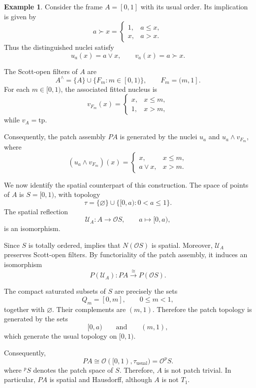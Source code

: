 \documentclass[11pt]{amsart}
\theoremstyle{plain}
\theoremstyle{definition}
\newtheorem{ej}[thm]{Example}
\begin{document}
\begin{ej}\label{ex:unit-interval-patch}
Consider the frame $A=[0,1]$ with its usual
order. Its implication is given by
\[
a\succ x=
\begin{cases}
1,&a\leq x,\\
x,&a>x.
\end{cases}
\]
Thus the distinguished nuclei satisfy
\[
u_a(x)=a\vee x,
\qquad
v_a(x)=a\succ x.
\]

The Scott-open filters of $A$ are
\[
A^\wedge
=\{A\}\cup\{F_m:m\in[0,1)\},
\qquad F_m=(m,1].
\]
For each $m\in[0,1)$, the associated fitted
nucleus is
\[
v_{F_m}(x)=
\begin{cases}
x,&x\leq m,\\
1,&x>m,
\end{cases}
\]
while $v_A=\mathrm{tp}$.

Consequently, the patch assembly $PA$ is
generated by the nuclei $u_a$ and
$u_a\wedge v_{F_m}$, where
\[
(u_a\wedge v_{F_m})(x)=
\begin{cases}
x,&x\leq m,\\
a\vee x,&x>m.
\end{cases}
\]

We now identify the spatial counterpart of
this construction. The space of points of
$A$ is $S=[0,1)$, with topology
\[
\tau=\{\varnothing\}\cup
\{[0,a):0<a\leq1\}.
\]
The spatial reflection
\[
\mathcal U_A:A\longrightarrow\mathcal OS,
\qquad a\longmapsto[0,a),
\]
is an isomorphism.

Since $S$ is totally ordered,
\cite[Corollary 4.2]{AvilaBezhaniMorandiZaldivar2020}
implies that $N(\mathcal OS)$ is spatial.
Moreover, $\mathcal U_A$ preserves
Scott-open filters. By functoriality of
the patch assembly, it induces an
isomorphism
\[
P(\mathcal U_A):PA
\xrightarrow{\cong}P(\mathcal OS).
\]

The compact saturated subsets of $S$ are
precisely the sets
\[
Q_m=[0,m],\qquad 0\leq m<1,
\]
together with $\varnothing$.
Their complements are $(m,1)$.
Therefore the patch topology is generated
by the sets
\[
[0,a)\qquad\text{and}\qquad(m,1),
\]
which generate the usual topology on
$[0,1)$.

Consequently,
\[
PA\cong
\mathcal O([0,1),\tau_{\mathrm{usual}})=\mathcal{O}^pS.
\]
where $^p S$ denotes the patch space of $S$.
Therefore, $A$ is not patch trivial. In particular, $PA$ is spatial and
Hausdorff, although $A$ is not $T_1$.

\end{ej}
\end{document}
